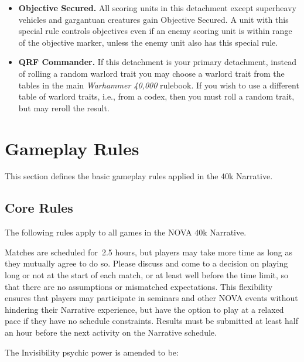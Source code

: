 \documentclass{novanarrative}
\begin{document}
\begin{itemize}
\item \textbf{Objective Secured.} All scoring units in this detachment
  except superheavy vehicles and gargantuan creatures gain Objective
  Secured. A unit with this special rule controls objectives even if
  an enemy scoring unit is within range of the objective marker,
  unless the enemy unit also has this special rule.

\item \textbf{QRF Commander.} If this detachment is your primary
  detachment, instead of rolling a random warlord trait you may choose
  a warlord trait from the tables in the main \emph{Warhammer 40,000}
  rulebook.  If you wish to use a different table of warlord traits,
  i.e., from a codex, then you must roll a random trait, but may
  reroll the result.

\end{itemize}

\makeatletter\@openrightfalse
\chapter{Gameplay Rules}
\@openrighttrue\makeatother

This section defines the basic gameplay rules applied in the 40k Narrative.

\section{Core Rules}

The following rules apply to all games in the NOVA 40k Narrative.

Matches are scheduled for~2.5 hours, but players may take more time as
long as they mutually agree to do so.  Please discuss and come to a
decision on playing long or not at the start of each match, or at
least well before the time limit, so that there are no assumptions or
mismatched expectations.  This flexibility ensures that players may
participate in seminars and other NOVA events without hindering their
Narrative experience, but have the option to play at a relaxed pace if
they have no schedule constraints.  Results must be submitted at least
half an hour before the next activity on the Narrative schedule.

The Invisibility psychic power is amended to be:
\end{document}
